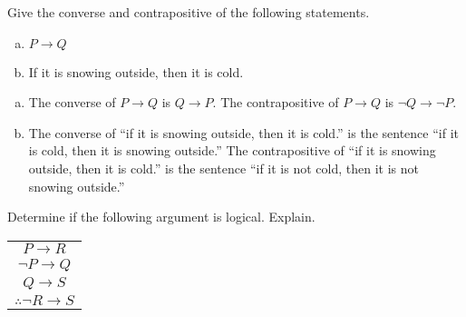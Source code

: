 \documentclass[11pt,letterpaper]{article}
\begin{document}
\newpage



 Give the converse and contrapositive of the following statements. 
	\begin{enumerate}[(a),topsep=0pt]
	\item $P \to Q$
	\item If it is snowing outside, then it is cold.
	\end{enumerate}

\sol
\begin{enumerate}[(a)]
\item The converse of $P \to Q$ is $Q \to P$. The contrapositive of $P \to Q$ is $\neg Q \to \neg P$. 

\item The converse of ``if it is snowing outside, then it is cold.'' is the sentence ``if it is cold, then it is snowing outside.'' The contrapositive of ``if it is snowing outside, then it is cold.'' is the sentence ``if it is not cold, then it is not snowing outside.'' 
\end{enumerate}



\newpage



 Determine if the following argument is logical. Explain. 
	\begin{table}[!ht]
	\centering
	\begin{tabular}{c}
	$P \to R$ \\
	$\neg P \to Q$ \\
	$Q \to S$ \\ \hline
	$\therefore \neg R \to S$
	\end{tabular}
	\end{table}
\end{document}

